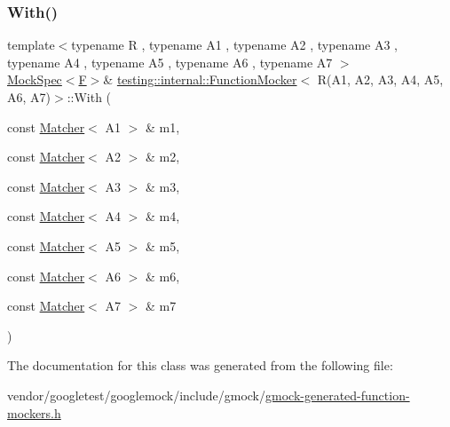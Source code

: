 \subsubsection{\texorpdfstring{With()}{With()}}
{\footnotesize\ttfamily template$<$typename R , typename A1 , typename A2 , typename A3 , typename A4 , typename A5 , typename A6 , typename A7 $>$ \\
\hyperlink{classtesting_1_1internal_1_1_mock_spec}{Mock\+Spec}$<$\hyperlink{classtesting_1_1internal_1_1_function_mocker_3_01_r_07_a1_00_01_a2_00_01_a3_00_01_a4_00_01_a5_00_01_a6_00_01_a7_08_4_a2ea0e33d9cc0d1f57d58b4aee98c117c}{F}$>$\& \hyperlink{classtesting_1_1internal_1_1_function_mocker}{testing\+::internal\+::\+Function\+Mocker}$<$ R(A1, A2, A3, A4, A5, A6, A7)$>$\+::With (\begin{DoxyParamCaption}\item[{const \hyperlink{classtesting_1_1_matcher}{Matcher}$<$ A1 $>$ \&}]{m1,  }\item[{const \hyperlink{classtesting_1_1_matcher}{Matcher}$<$ A2 $>$ \&}]{m2,  }\item[{const \hyperlink{classtesting_1_1_matcher}{Matcher}$<$ A3 $>$ \&}]{m3,  }\item[{const \hyperlink{classtesting_1_1_matcher}{Matcher}$<$ A4 $>$ \&}]{m4,  }\item[{const \hyperlink{classtesting_1_1_matcher}{Matcher}$<$ A5 $>$ \&}]{m5,  }\item[{const \hyperlink{classtesting_1_1_matcher}{Matcher}$<$ A6 $>$ \&}]{m6,  }\item[{const \hyperlink{classtesting_1_1_matcher}{Matcher}$<$ A7 $>$ \&}]{m7 }\end{DoxyParamCaption})\hspace{0.3cm}{\ttfamily [inline]}}



The documentation for this class was generated from the following file\+:\begin{DoxyCompactItemize}
\item 
vendor/googletest/googlemock/include/gmock/\hyperlink{gmock-generated-function-mockers_8h}{gmock-\/generated-\/function-\/mockers.\+h}\end{DoxyCompactItemize}
